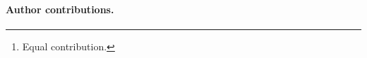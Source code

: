 \documentclass[11pt]{article}
\title{}
\author{%
  Jessie Dong\thanks{Equal contribution.}\\
  Stanford University\\
  \texttt{jessiedong@stanford.edu}
  \and
  Anish Chaudhuri\footnotemark[1]\\
  Stanford University\\
  \texttt{anishch@stanford.edu}
  \and
  Maya Vendhan\footnotemark[1]\\
  Stanford University\\
  \texttt{mvendhan@stanford.edu}}
\date{}
\begin{document}
\maketitle
\begin{abstract}

\end{abstract}









{\sloppy
\paragraph{Author contributions.}

\par}




\appendix

\end{document}
